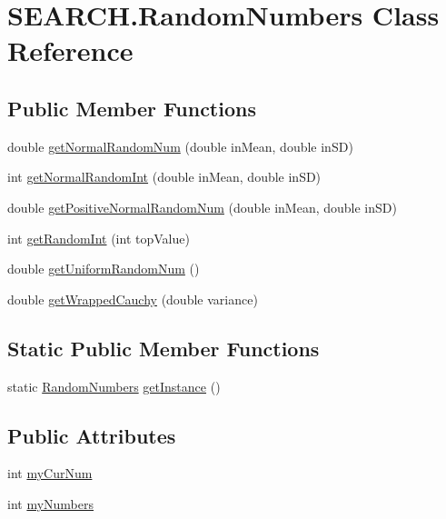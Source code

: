 \hypertarget{class_s_e_a_r_c_h_1_1_random_numbers}{\section{S\-E\-A\-R\-C\-H.\-Random\-Numbers Class Reference}
\label{class_s_e_a_r_c_h_1_1_random_numbers}
}
\subsection*{Public Member Functions}
\begin{DoxyCompactItemize}
\item 
double \hyperlink{class_s_e_a_r_c_h_1_1_random_numbers_a7f8b47e103b03d8f7fe37fc86e758654}{get\-Normal\-Random\-Num} (double in\-Mean, double in\-S\-D)
\begin{DoxyCompactList}\small\item\em \end{DoxyCompactList}\item 
int \hyperlink{class_s_e_a_r_c_h_1_1_random_numbers_acd06650a608e474e02dc0f68b1215b92}{get\-Normal\-Random\-Int} (double in\-Mean, double in\-S\-D)
\item 
double \hyperlink{class_s_e_a_r_c_h_1_1_random_numbers_ac40827080bdcab8a52d597441d01cf2d}{get\-Positive\-Normal\-Random\-Num} (double in\-Mean, double in\-S\-D)
\item 
int \hyperlink{class_s_e_a_r_c_h_1_1_random_numbers_a163c0d83e6c46aa2c931985c171a2d5b}{get\-Random\-Int} (int top\-Value)
\item 
double \hyperlink{class_s_e_a_r_c_h_1_1_random_numbers_a0cd584299d6ec7ac564c237e5aeeebf1}{get\-Uniform\-Random\-Num} ()
\item 
double \hyperlink{class_s_e_a_r_c_h_1_1_random_numbers_aad39f9e85e2f2283ce86f0050cb8653b}{get\-Wrapped\-Cauchy} (double variance)
\end{DoxyCompactItemize}
\subsection*{Static Public Member Functions}
\begin{DoxyCompactItemize}
\item 
static \hyperlink{class_s_e_a_r_c_h_1_1_random_numbers}{Random\-Numbers} \hyperlink{class_s_e_a_r_c_h_1_1_random_numbers_af310df8be52434e2abc379cc15c963f9}{get\-Instance} ()
\end{DoxyCompactItemize}
\subsection*{Public Attributes}
\begin{DoxyCompactItemize}
\item 
int \hyperlink{class_s_e_a_r_c_h_1_1_random_numbers_a600e83b2a48a864a5c27e442d5d29047}{my\-Cur\-Num}
\item 
int \hyperlink{class_s_e_a_r_c_h_1_1_random_numbers_ac488b2ec19b447cf9fd5e438ab6c8a9e}{my\-Numbers}
\end{DoxyCompactItemize}
